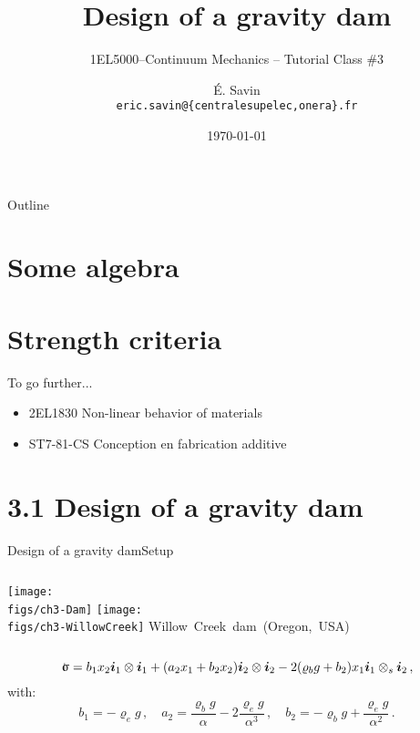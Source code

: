 \documentclass{beamer}
\title[1EL5000/S3]
{Design of a gravity dam}
\subtitle{1EL5000--Continuum Mechanics -- Tutorial Class \#3} %
\author[\'E. Savin] %
{\'E. Savin\inst{1,2}\\ \scriptsize{\texttt{eric.savin@\{centralesupelec,onera\}.fr}}}%
\institute[Onera] %
{\inst{1}{Information Processing and Systems Dept.\\\Onera, France}
\and
 \inst{2}{Mechanical and Civil Engineering Dept.\\\ECP, France}}%
\date{\today}
\newcommand{\xj}{x}
\renewcommand{\ij}{i}
\newcommand{\iv}{{\boldsymbol\ij}}
\newcommand{\roi}{\varrho}
\newcommand{\stress}{\mbox{$\hspace{0.3em}\rotatebox[x=0pt,y=0.2pt]{90}{\rule{0.017\linewidth}{0.4pt}}\hspace{-0.25em}\upsigma$}}
\begin{document}
\begin{frame}
  \titlepage
\end{frame}

\begin{frame}{Outline}
  \tableofcontents
\end{frame}




\section{Some algebra}



\section{Strength criteria}



\begin{frame}{To go further...}{}

\begin{itemize}
\item 2EL1830 Non-linear behavior of materials
\item ST7-81-CS Conception en fabrication additive
\end{itemize}

\end{frame}

\section{3.1 Design of a gravity dam}

\begin{frame}{Design of a gravity dam}{Setup}

\begin{columns}[t]
\centering\texttt{[image: \\figs/ch3-Dam]}
\vskip-100pt
\centering\texttt{[image: \\figs/ch3-WillowCreek]}
\vskip-20pt{\hspace{5.2truecm}\mbox{\tiny{Willow Creek dam (Oregon, USA)}}}
\end{columns}
\begin{displaymath}
\stress=b_1\xj_2\iv_1\otimes\iv_1 + (a_2\xj_1+b_2\xj_2)\iv_2\otimes\iv_2-2(\roi_b g+b_2)\xj_1\iv_1\otimes_s\iv_2\,,
\end{displaymath}
with:
\begin{displaymath}
b_1=-\roi_e g\,,\quad a_2=\frac{\roi_b g}{\alpha}-2\frac{\roi_e g}{\alpha^3}\,,\quad b_2=-\roi_b g+\frac{\roi_e g}{\alpha^2}\,.
\end{displaymath}

\end{frame}
\end{document}
